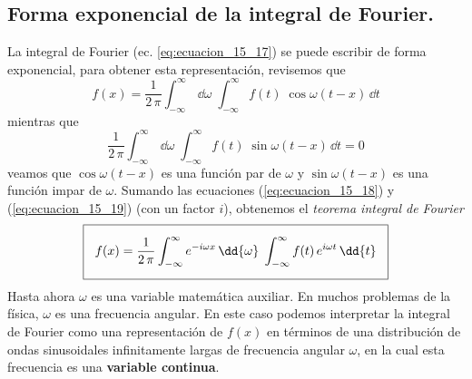 \subsection{Forma exponencial de la integral de Fourier.}
La integral de Fourier (ec. \ref{eq:ecuacion_15_17}) se puede escribir de forma exponencial, para obtener esta representación, revisemos que
\begin{equation}
f(x) =  \dfrac{1}{2 \, \pi} \int_{- \infty}^{\infty} \,\dd{\omega} \; \int_{-\infty}^{\infty} f(t) \; \cos \omega (t - x) \, \dd{t}
\label{eq:ecuacion_15_18}
\end{equation}
mientras que
\begin{equation}
\dfrac{1}{2 \, \pi} \int_{-\infty}^{\infty} \, \dd \omega \; \int_{-\infty}^{\infty} f(t) \; \sin \omega (t - x) \, \dd{t} = 0
\label{eq:ecuacion_15_19}
\end{equation}
veamos que $ \cos \omega (t - x)$ es una función par de $\omega$ y $\sin \omega (t - x)$ es una función impar de $\omega$. Sumando las ecuaciones (\ref{eq:ecuacion_15_18}) y (\ref{eq:ecuacion_15_19}) (con un factor $i$), obtenemos el \emph{teorema integral de Fourier}
\begin{equation}
\setlength{\fboxsep}{3\fboxsep}\boxed{
f(x) = \dfrac{1}{2 \, \pi} \int_{-\infty}^{\infty} e^{-i \omega x} \, \dd{\omega} \; \int_{-\infty}^{\infty} f(t) \, e^{i \omega t} \, \dd{t} }
\label{eq:ecuacion_15_20}
\end{equation}
Hasta ahora $\omega$ es una variable matemática auxiliar. En muchos problemas de la física, $\omega$ es una frecuencia angular. En este caso podemos interpretar la integral de Fourier como una representación de $f(x)$ en términos de una distribución de ondas sinusoidales infinitamente largas de frecuencia angular $\omega$, en la cual esta frecuencia es una \textbf{variable continua}.
